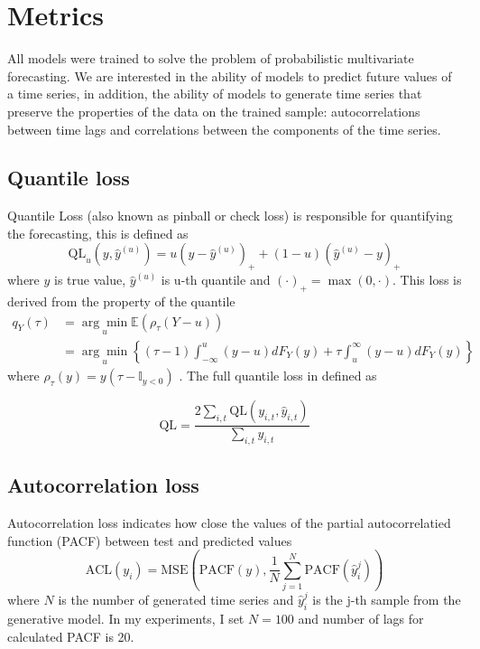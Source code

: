 \documentclass[12pt,a4paper]{article}
\begin{document}
\section{Metrics}

All models were trained to solve the problem of probabilistic multivariate forecasting. We are interested in the ability of models to predict future values of a time series, in addition, the ability of models to generate time series that preserve the properties of the data on the trained sample: autocorrelations between time lags and correlations between the components of the time series.

\subsection{Quantile loss}

Quantile Loss (also known as pinball or check loss) is responsible for quantifying the forecasting, this is defined as 
$$\text{QL}_{u}\left(y, \hat{y}^{(u)}\right)=u\left(y-\hat{y}^{(u)}\right)_{+}+(1-u)\left(\hat{y}^{(u)}-y\right)_{+}$$
where $y$ is true value, $\hat y^{(u)}$ is u-th quantile and $(\cdot)_+ = \max(0, \cdot)$.
This loss is derived from the property of the quantile
$$
\begin{aligned}
q_{Y}(\tau) &=\underset{u}{\arg \min } \mathbb E\left(\rho_{\tau}(Y-u)\right)\\
&=\underset{u}{\arg \min }\left\{(\tau-1) \int_{-\infty}^{u}(y-u) d F_{Y}(y)+\tau \int_{u}^{\infty}(y-u) d F_{Y}(y)\right\}    
\end{aligned}$$
where $\rho_{\tau}(y) = y(\tau - \mathbb I_{y<0})$ \cite{Koenker2005}. The full quantile loss in defined as

$$\text{QL} = \frac{2 \sum_{i,t} \text{QL}(y_{i,t}, \hat y_{i,t})}{\sum_{i,t} y_{i, t}}$$

\subsection{Autocorrelation loss}

Autocorrelation loss indicates how close the values of the partial autocorrelatied function (PACF) between test and predicted values
$$\text{ACL} (y_{i}) = \text{MSE}
\left(\text{PACF}(y), \frac{1}{N} \sum_{j=1}^N \text{PACF}(\hat y_i^j) \right)
$$
where $N$ is the number of generated time series and $\hat y_{i}^j$ is the j-th sample from the generative model. In my experiments, I set $N=100$ and number of lags for calculated PACF is 20.
\end{document}
